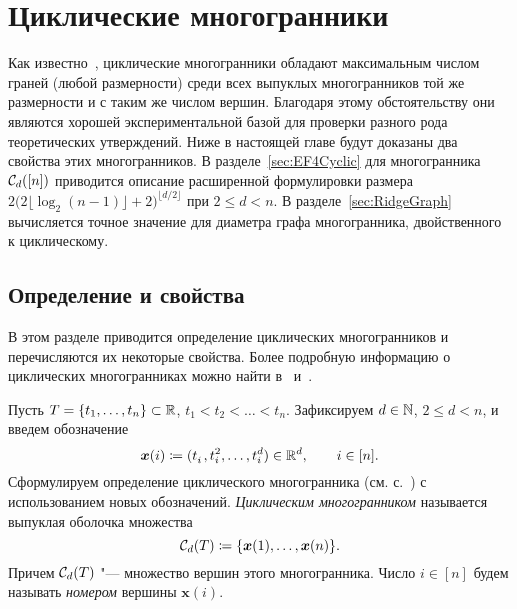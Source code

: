 
%
%
\chapter{Циклические многогранники}
\label{chap:Cyclic}


Как известно~\cite{McMullen:1970}, циклические многогранники обладают максимальным числом граней (любой размерности) среди всех выпуклых многогранников той же размерности и с таким же числом вершин.
Благодаря этому обстоятельству они являются хорошей экспериментальной базой для проверки разного рода теоретических утверждений.
Ниже в настоящей главе будут доказаны два свойства этих многогранников.
В разделе~\ref{sec:EF4Cyclic} для многогранника ${\mathcal C}_d([n])$ приводится описание расширенной формулировки размера $2\bigl(2\lfloor \log_2(n-1)\rfloor+2\bigr)^{\lfloor d/2 \rfloor}$ при $2 \le d < n$.
В разделе~\ref{sec:RidgeGraph} вычисляется точное значение для диаметра графа многогранника, двойственного к циклическому.


\section{Определение и свойства}

В этом разделе приводится определение циклических многогранников и перечисляются их некоторые свойства.
Более подробную информацию о циклических многогранниках можно найти в~\cite{Grunbaum:2003} и~\cite{ZieglerBook}.

Пусть $T = \{t_1, \dots, t_n\} \subset \mathbb{R}$, $t_1 < t_2 < \dots < t_n$.
Зафиксируем $d \in \mathbb{N}$, $2 \le d < n$, и введем обозначение
\begin{equation}
\label{eq:x(t)}
\bm{x}(i) \coloneqq (t^{\phantom{1}}_i, t^2_i, \dots, t^d_i) \in \mathbb{R}^d, \qquad i\in[n]. 
\end{equation}
Сформулируем определение циклического многогранника (см. с.~\pageref{page:cyclic}) с использованием новых обозначений.
\emph{Циклическим многогранником} называется выпуклая оболочка множества
\[
{\mathcal C}_d(T) \coloneqq \{\bm{x}(1), \dots, \bm{x}(n)\}.
\]
Причем ${\mathcal C}_d(T)$ "--- множество вершин этого многогранника.
Число $i\in[n]$ будем называть \emph{номером} вершины $\bm{x}(i)$.

